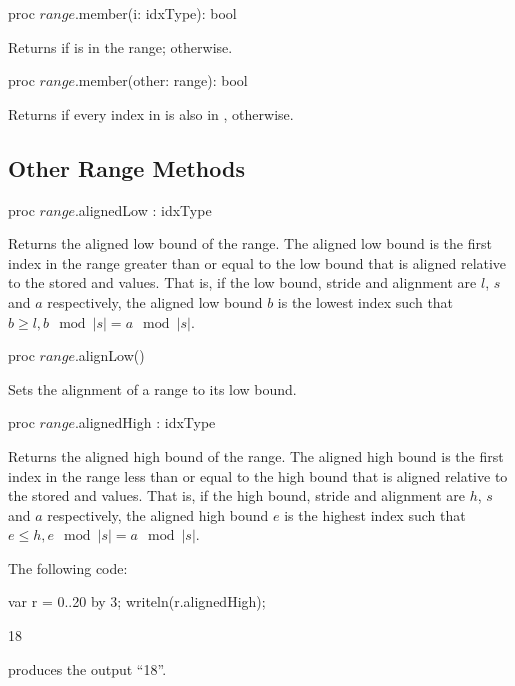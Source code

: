 \begin{protohead}
proc $range$.member(i: idxType): bool
\end{protohead}
\begin{protobody}
Returns  if  is in the range;  otherwise.
\end{protobody}

\begin{protohead}
proc $range$.member(other: range): bool
\end{protohead}
\begin{protobody}
Returns  if every index in  is also in ,  otherwise.
\end{protobody}

\subsection{Other Range Methods}

\begin{protohead}
proc $range$.alignedLow : idxType
\end{protohead}
\begin{protobody}
Returns the aligned low bound of the range.  
The aligned low bound is the first
index in the range greater than or equal to the low bound that is
aligned relative to the stored  and  values.  That
is, if the low bound, stride and alignment are $l$, $s$ and $a$ respectively,
the aligned low bound $b$ is the lowest index such that $b \geq l, b\!\mod |s| =
a\!\mod |s|$.
\end{protobody}

\begin{protohead}
proc $range$.alignLow()
\end{protohead}
\begin{protobody}
Sets the alignment of a range to its low bound.
\end{protobody}

\begin{protohead}
proc $range$.alignedHigh : idxType
\end{protohead}
\begin{protobody}
Returns the aligned high bound of the range.  
The aligned high bound is the first
index in the range less than or equal to the high bound that is
aligned relative to the stored  and  values.  That
is, if the high bound, stride and alignment are $h$, $s$ and $a$ respectively,
the aligned high bound $e$ is the highest index such that $e \leq h, e\!\mod |s| =
a\!\mod |s|$.
\end{protobody}
\begin{example}
The following code:
\begin{chapelpre}
\end{chapelpre}
\begin{chapel}
var r = 0..20 by 3;
writeln(r.alignedHigh);
\end{chapel}
\begin{chapeloutput}
18
\end{chapeloutput}
produces the output ``18''.
\end{example}

